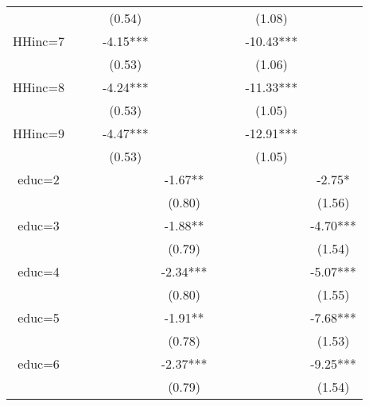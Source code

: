 \begin{table}[ht]
\begin{adjustbox}{width={0.9\textwidth},totalheight={\textheight}}
\begin{threeparttable}
\begin{tabular}{ccccccccc}
             &          &           &     (0.54) &             &           &            &      (1.08) &              \\
HHinc=7      &          &           &   -4.15*** &             &           &            &   -10.43*** &              \\
             &          &           &     (0.53) &             &           &            &      (1.06) &              \\
HHinc=8      &          &           &   -4.24*** &             &           &            &   -11.33*** &              \\
             &          &           &     (0.53) &             &           &            &      (1.05) &              \\
HHinc=9      &          &           &   -4.47*** &             &           &            &   -12.91*** &              \\
             &          &           &     (0.53) &             &           &            &      (1.05) &              \\
educ=2       &          &           &            &     -1.67** &           &            &             &       -2.75* \\
             &          &           &            &      (0.80) &           &            &             &       (1.56) \\
educ=3       &          &           &            &     -1.88** &           &            &             &     -4.70*** \\
             &          &           &            &      (0.79) &           &            &             &       (1.54) \\
educ=4       &          &           &            &    -2.34*** &           &            &             &     -5.07*** \\
             &          &           &            &      (0.80) &           &            &             &       (1.55) \\
educ=5       &          &           &            &     -1.91** &           &            &             &     -7.68*** \\
             &          &           &            &      (0.78) &           &            &             &       (1.53) \\
educ=6       &          &           &            &    -2.37*** &           &            &             &     -9.25*** \\
             &          &           &            &      (0.79) &           &            &             &       (1.54) \\

\end{tabular}
\end{threeparttable}
\end{adjustbox}
\end{table}

